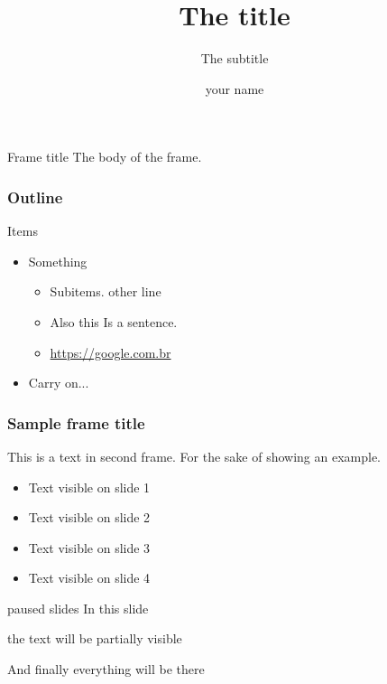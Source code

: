 \documentclass[pdf]{beamer}
\title{The title}
\subtitle{The subtitle}
\author{your name}
\institute{myself}
\begin{document}
\begin{frame}
    \titlepage
    \end{frame}
    \begin{frame}{Frame title}
    The body of the frame.
\end{frame}

\begin{frame}
    \frametitle{Outline}
    \tableofcontents
\end{frame}


\begin{frame}{Items}
    \begin{itemize}
    \item Something
      \begin{itemize}
      \item Subitems.
        other line
      \item Also this
        Is a sentence.
      \item \url{https://google.com.br}
      \end{itemize}
    \item Carry on...
    \end{itemize}
  \end{frame}




\begin{frame}
    \frametitle{Sample frame title}
    This is a text in second frame. 
    For the sake of showing an example.
    
    \begin{itemize}
     \item<1-> Text visible on slide 1
     \item<2-> Text visible on slide 2
     \item<3> Text visible on slide 3
     \item<4-> Text visible on slide 4
    \end{itemize}
    
\end{frame}

\begin{frame}{paused slides}
 In this slide \pause

 the text will be partially visible \pause

 And finally everything will be there
\end{frame}
\end{document}

